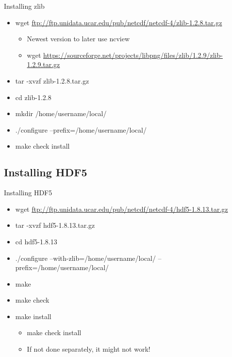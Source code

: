 \documentclass[compress,11pt,xcolor=svgnames,aspectratio=169]{beamer}
\begin{document}
\begin{frame}[fragile]{Installing zlib}

\begin{itemize}

  \item wget \url{ftp://ftp.unidata.ucar.edu/pub/netcdf/netcdf-4/zlib-1.2.8.tar.gz}
  \begin{itemize}
    \item Newest version to later use ncview
    \item wget \url{https://sourceforge.net/projects/libpng/files/zlib/1.2.9/zlib-1.2.9.tar.gz}
  \end{itemize}
  \item tar -xvzf zlib-1.2.8.tar.gz
  \item cd zlib-1.2.8
  \item mkdir /home/username/local/
  \item ./configure --prefix=/home/username/local/
  \item make check install

\end{itemize}

\end{frame}

\subsection{Installing HDF5}

\begin{frame}[fragile]{Installing HDF5}

\begin{itemize}

  \item wget \url{ftp://ftp.unidata.ucar.edu/pub/netcdf/netcdf-4/hdf5-1.8.13.tar.gz}
  \item tar -xvzf hdf5-1.8.13.tar.gz
  \item cd hdf5-1.8.13
  \item ./configure --with-zlib=/home/username/local/ --prefix=/home/username/local/
  \item make
  \item make check
  \item make install
  \begin{itemize}
    \item make check install
    \item If not done separately, it might not work!
  \end{itemize}
\end{itemize}

\end{frame}
\end{document}
